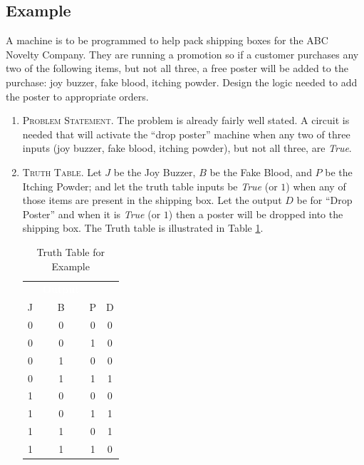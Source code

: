 \subsection{Example}
\label{05:subsec:example}

A machine is to be programmed to help pack shipping boxes for the ABC Novelty Company. They are running a promotion so if a customer purchases any two of the following items, but not all three, a free poster will be added to the purchase: joy buzzer, fake blood, itching powder. Design the logic needed to add the poster to appropriate orders. 

\begin{enumerate}
  \item \textsc{Problem Statement}. The problem is already fairly well stated. A circuit is needed that will activate the ``drop poster'' machine when any two of three inputs (joy buzzer, fake blood, itching powder), but not all three, are \emph{True}. 

  \item \textsc{Truth Table}. Let $ J $ be the Joy Buzzer, $ B $ be the Fake Blood, and $ P $ be the Itching Powder; and let the truth table inputs be \emph{True} (or $ 1 $) when any of those items are present in the shipping box. Let the output $ D $ be for ``Drop Poster'' and when it is \emph{True} (or $ 1 $) then a poster will be dropped into the shipping box. The Truth table is illustrated in Table  \ref{05:tab:truth_table_for_example}.
  
  \begin{table}[H]
    \sffamily
    \newcommand{\head}[1]{\textcolor{white}{\textbf{#1}}}    
    \begin{center}
      \begin{tabular}{cccc} 
        \rowcolor{black!75}
        \multicolumn{3}{c}{\head{Inputs}} & \head{Output} \\
        J & B & P & D \\
        \hline
        0 & 0 & 0 & 0 \\
        0 & 0 & 1 & 0 \\
        0 & 1 & 0 & 0 \\
        0 & 1 & 1 & 1 \\
        1 & 0 & 0 & 0 \\
        1 & 0 & 1 & 1 \\
        1 & 1 & 0 & 1 \\
        1 & 1 & 1 & 0
      \end{tabular}
    \end{center}
    \caption{Truth Table for Example}
    \label{05:tab:truth_table_for_example}
  \end{table}
  

\end{enumerate}
